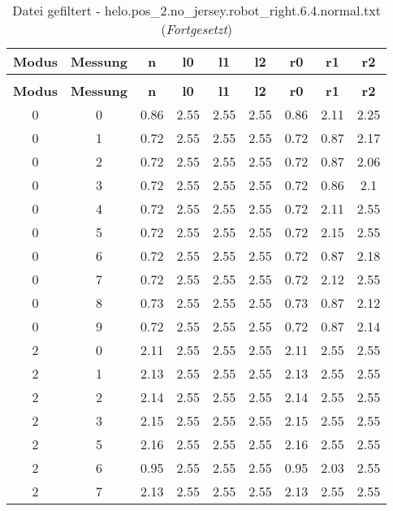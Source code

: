 \begin{longtable}{|c|c||c||c|c|c||c|c|c|}
	\caption{Datei gefiltert - helo.pos\_2.no\_jersey.robot\_right.6.4.normal.txt} \label{tab:helo.pos-2.no-jersey.robot-right.6.4.normal.txt} \\ \hline
	\textbf{Modus} & \textbf{Messung} & \textbf{n} & \textbf{l0} & \textbf{l1} & \textbf{l2} & \textbf{r0} & \textbf{r1} & \textbf{r2}\\ \hline
	\endfirsthead
	\caption[]{Datei gefiltert - helo.pos\_2.no\_jersey.robot\_right.6.4.normal.txt (\emph{Fortgesetzt})} \\ \hline
	\textbf{Modus} & \textbf{Messung} & \textbf{n} & \textbf{l0} & \textbf{l1} & \textbf{l2} & \textbf{r0} & \textbf{r1} & \textbf{r2}\\ \hline
	\endhead
	0 & 0 & 0.86 & 2.55 & 2.55 & 2.55 & 0.86 & 2.11 & 2.25 \\ \hline
	0 & 1 & 0.72 & 2.55 & 2.55 & 2.55 & 0.72 & 0.87 & 2.17 \\ \hline
	0 & 2 & 0.72 & 2.55 & 2.55 & 2.55 & 0.72 & 0.87 & 2.06 \\ \hline
	0 & 3 & 0.72 & 2.55 & 2.55 & 2.55 & 0.72 & 0.86 & 2.1 \\ \hline
	0 & 4 & 0.72 & 2.55 & 2.55 & 2.55 & 0.72 & 2.11 & 2.55 \\ \hline
	0 & 5 & 0.72 & 2.55 & 2.55 & 2.55 & 0.72 & 2.15 & 2.55 \\ \hline
	0 & 6 & 0.72 & 2.55 & 2.55 & 2.55 & 0.72 & 0.87 & 2.18 \\ \hline
	0 & 7 & 0.72 & 2.55 & 2.55 & 2.55 & 0.72 & 2.12 & 2.55 \\ \hline
	0 & 8 & 0.73 & 2.55 & 2.55 & 2.55 & 0.73 & 0.87 & 2.12 \\ \hline
	0 & 9 & 0.72 & 2.55 & 2.55 & 2.55 & 0.72 & 0.87 & 2.14 \\ \hline
	2 & 0 & 2.11 & 2.55 & 2.55 & 2.55 & 2.11 & 2.55 & 2.55 \\ \hline
	2 & 1 & 2.13 & 2.55 & 2.55 & 2.55 & 2.13 & 2.55 & 2.55 \\ \hline
	2 & 2 & 2.14 & 2.55 & 2.55 & 2.55 & 2.14 & 2.55 & 2.55 \\ \hline
	2 & 3 & 2.15 & 2.55 & 2.55 & 2.55 & 2.15 & 2.55 & 2.55 \\ \hline
	2 & 5 & 2.16 & 2.55 & 2.55 & 2.55 & 2.16 & 2.55 & 2.55 \\ \hline
	2 & 6 & 0.95 & 2.55 & 2.55 & 2.55 & 0.95 & 2.03 & 2.55 \\ \hline
	2 & 7 & 2.13 & 2.55 & 2.55 & 2.55 & 2.13 & 2.55 & 2.55 \\ \hline

\end{longtable}
